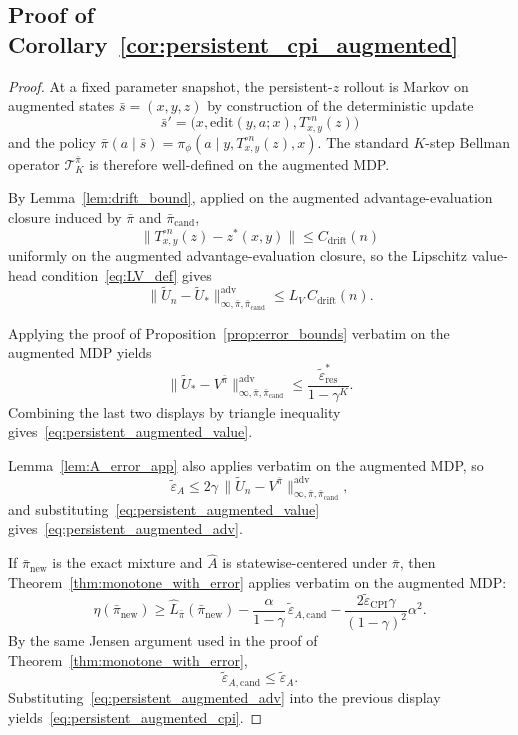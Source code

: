 \documentclass{article}
\theoremstyle{plain}
\theoremstyle{definition}
\theoremstyle{remark}
\newcommand{\Cdrift}{C_{\mathrm{drift}}}
\begin{document}
\subsection{Proof of Corollary~\ref{cor:persistent_cpi_augmented}}

\begin{proof}
At a fixed parameter snapshot, the persistent-$z$ rollout is Markov on augmented states $\bar s=(x,y,z)$ by construction of the deterministic update
\[
\bar s' = \bigl(x,\mathrm{edit}(y,a;x),T_{x,y}^{\circ n}(z)\bigr)
\]
and the policy $\bar\pi(a\mid \bar s)=\pi_\phi(a\mid y,T_{x,y}^{\circ n}(z),x)$.
The standard $K$-step Bellman operator $\mathcal{T}^{\bar\pi}_K$ is therefore well-defined on the augmented MDP.

By Lemma~\ref{lem:drift_bound}, applied on the augmented advantage-evaluation closure induced by $\bar\pi$ and $\bar\pi_{\mathrm{cand}}$,
\[
\|T_{x,y}^{\circ n}(z)-z^*(x,y)\| \le \Cdrift(n)
\]
uniformly on the augmented advantage-evaluation closure, so the Lipschitz value-head condition~\eqref{eq:LV_def} gives
\[
\|\widetilde U_n-\widetilde U_*\|_{\infty,\bar\pi,\bar\pi_{\mathrm{cand}}}^{\mathrm{adv}}
\le
L_V\,\Cdrift(n).
\]

Applying the proof of Proposition~\ref{prop:error_bounds} verbatim on the augmented MDP yields
\[
\|\widetilde U_* - V^{\bar\pi}\|_{\infty,\bar\pi,\bar\pi_{\mathrm{cand}}}^{\mathrm{adv}}
\le
\frac{\widetilde \varepsilon_{\mathrm{res}}^*}{1-\gamma^K}.
\]
Combining the last two displays by triangle inequality gives~\eqref{eq:persistent_augmented_value}.

Lemma~\ref{lem:A_error_app} also applies verbatim on the augmented MDP, so
\[
\widetilde \varepsilon_A
\le
2\gamma\,
\|\widetilde U_n - V^{\bar\pi}\|_{\infty,\bar\pi,\bar\pi_{\mathrm{cand}}}^{\mathrm{adv}},
\]
and substituting~\eqref{eq:persistent_augmented_value} gives~\eqref{eq:persistent_augmented_adv}.

If $\bar\pi_{\mathrm{new}}$ is the exact mixture and $\widehat A$ is statewise-centered under $\bar\pi$, then Theorem~\ref{thm:monotone_with_error} applies verbatim on the augmented MDP:
\[
\eta(\bar\pi_{\mathrm{new}})
\ge
\widehat L_{\bar\pi}(\bar\pi_{\mathrm{new}})
-
\frac{\alpha}{1-\gamma}\,\widetilde \varepsilon_{A,\mathrm{cand}}
-
\frac{2\widetilde \varepsilon_{\mathrm{CPI}}\gamma}{(1-\gamma)^2}\alpha^2.
\]
By the same Jensen argument used in the proof of Theorem~\ref{thm:monotone_with_error},
\[
\widetilde \varepsilon_{A,\mathrm{cand}} \le \widetilde \varepsilon_A.
\]
Substituting~\eqref{eq:persistent_augmented_adv} into the previous display yields~\eqref{eq:persistent_augmented_cpi}.
\end{proof}
\end{document}
